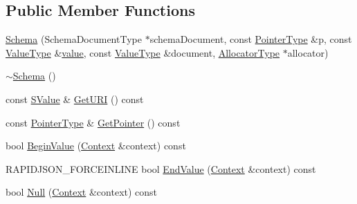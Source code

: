 \subsection*{Public Member Functions}
\begin{DoxyCompactItemize}
\item 
\mbox{\hyperlink{classrapidjson_1_1internal_1_1_schema_ae3162ff304fdbf7c317dab0a7f07a318}{Schema}} (Schema\+Document\+Type $\ast$schema\+Document, const \mbox{\hyperlink{classrapidjson_1_1internal_1_1_schema_aa54c71c41aa8a9091565d12ffe27627c}{Pointer\+Type}} \&p, const \mbox{\hyperlink{classrapidjson_1_1internal_1_1_schema_a3979a9083c598195927c08c6e3ba91d1}{Value\+Type}} \&\mbox{\hyperlink{namespacerapidjson_a1a75d60792094d496b500c40776030dd}{value}}, const \mbox{\hyperlink{classrapidjson_1_1internal_1_1_schema_a3979a9083c598195927c08c6e3ba91d1}{Value\+Type}} \&document, \mbox{\hyperlink{classrapidjson_1_1internal_1_1_schema_aaca940c164d906fdbf504f562bb2f956}{Allocator\+Type}} $\ast$allocator)
\item 
\mbox{\hyperlink{classrapidjson_1_1internal_1_1_schema_aa9f6a709c355fd2347cba3d5e3d32cfc}{$\sim$\+Schema}} ()
\item 
const \mbox{\hyperlink{classrapidjson_1_1internal_1_1_schema_a9f716b06fc542c4cdb7d8d5cf463bf79}{S\+Value}} \& \mbox{\hyperlink{classrapidjson_1_1internal_1_1_schema_ace4e93a2f9b6fcc46fdb4e0431860ef7}{Get\+U\+RI}} () const
\item 
const \mbox{\hyperlink{classrapidjson_1_1internal_1_1_schema_aa54c71c41aa8a9091565d12ffe27627c}{Pointer\+Type}} \& \mbox{\hyperlink{classrapidjson_1_1internal_1_1_schema_a399eb543be3ab17239dd4e54289dd6f5}{Get\+Pointer}} () const
\item 
bool \mbox{\hyperlink{classrapidjson_1_1internal_1_1_schema_abc55e67708a79ef20f2d9bb969a66949}{Begin\+Value}} (\mbox{\hyperlink{classrapidjson_1_1internal_1_1_schema_afca06b1f51d1bc18403bdf3f4d55ffef}{Context}} \&context) const
\item 
R\+A\+P\+I\+D\+J\+S\+O\+N\+\_\+\+F\+O\+R\+C\+E\+I\+N\+L\+I\+NE bool \mbox{\hyperlink{classrapidjson_1_1internal_1_1_schema_a6a23f4f0c794779e3e257d7b360dc8b7}{End\+Value}} (\mbox{\hyperlink{classrapidjson_1_1internal_1_1_schema_afca06b1f51d1bc18403bdf3f4d55ffef}{Context}} \&context) const
\item 
bool \mbox{\hyperlink{classrapidjson_1_1internal_1_1_schema_a31efa42f0cf98eaa6336f8bedbddd026}{Null}} (\mbox{\hyperlink{classrapidjson_1_1internal_1_1_schema_afca06b1f51d1bc18403bdf3f4d55ffef}{Context}} \&context) const
\item 

\end{DoxyCompactItemize}
